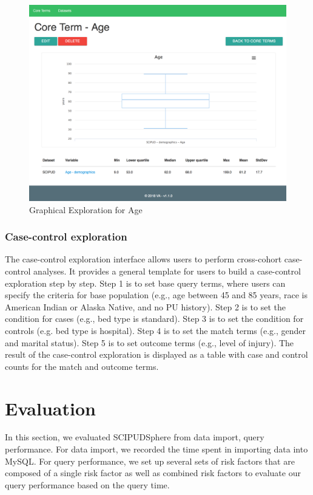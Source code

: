\documentclass{amia}
\begin{document}
\begin{figure}[h!]
  \centering
  \includegraphics[scale=0.35]{pics/graphical.png}
  \caption{Graphical Exploration for Age}
  \label{graphical}
\end{figure}

\subsubsection{Case-control exploration}
The case-control exploration interface allows users to perform cross-cohort case-control analyses. It provides a general template for users to build a case-control exploration step by step. Step 1 is to set base query terms, where users can specify the criteria for base population (e.g., age between 45 and 85 years, race is American Indian or Alaska Native, and no PU history). Step 2 is to set the condition for cases (e.g., bed type is standard). Step 3 is to set the condition for controls (e.g. bed type is hospital). Step 4 is to set the match terms (e.g., gender and marital status). Step 5 is to set outcome terms (e.g., level of injury). The result of the case-control exploration is displayed as a table with case and control counts for the match and outcome terms.

\section{Evaluation}
In this section, we evaluated SCIPUDSphere from data import, query performance. For data import, we recorded the time spent in importing data into MySQL. For query performance, we set up several sets of risk factors that are composed of a  single risk factor as well as combined risk factors to evaluate our query performance based on the query time.
\end{document}
